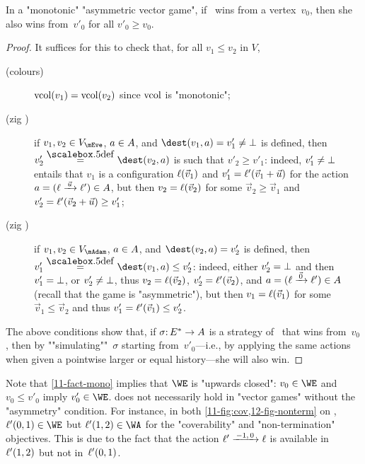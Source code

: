 \begin{lemma}[Simulation]\label{11-fact-mono}
  In a "monotonic" "asymmetric vector game", if \Eve\ wins from a
  vertex~$v_0$, then she also wins from~$v'_0$ for all $v'_0\geq
  v_0$.
\end{lemma}
\begin{proof}
  It suffices for this to check that, for all $v_1\leq v_2$ in $V$,
  \begin{description}
  \item[(colours)] $\mathrm{vcol}(v_1)=\mathrm{vcol}(v_2)$ since $\mathrm{vcol}$ is "monotonic";
  \item[(zig \Eve)] if $v_1,v_2\in V_\mEve$, $a\in A$, and
    $\dest(v_1,a)=v'_1\neq\sink$ is defined, then
    $v'_2\eqdef\dest(v_2,a)$ is such that $v'_2\geq v'_1$: indeed,
    $v'_1\neq\bot$ entails that $v_1$ is a configuration
    $\ell(\vec v_1)$ and $v'_1=\ell'(\vec v_1+\vec u)$ for the action
    $a=(\loc\step{\vec u}\loc')\in\Act$, but then $v_2=\ell(\vec v_2)$
    for some $\vec v_2\geq\vec v_1$ and
    $v'_2=\ell'(\vec v_2+\vec u)\geq v'_1$;
  \item[(zig \Adam)] if $v_1,v_2\in V_\mAdam$, $a\in A$, and
    $\dest(v_2,a)=v'_2$ is defined, then
    $v'_1\eqdef\dest(v_1,a)\leq v'_2$: indeed, either $v'_2=\bot$ and
    then $v'_1=\bot$, or $v'_2\neq\bot$, thus
    $v_2=\ell(\vec v_2)$, $v'_2=\ell'(\vec v_2)$, and
    $a=(\loc\step{\vec 0}\loc')\in\Act$ (recall that the game is
    "asymmetric"), but then $v_1=\ell(\vec v_1)$ for some
    $\vec v_1\leq\vec v_2$ and thus $v'_1=\ell'(\vec v_1)\leq v'_2$.
  \end{description}
  The above conditions show that, if $\sigma{:}\,E^\ast\to A$ is a
  strategy of \Eve\ that wins from~$v_0$, then by
  ""simulating""~$\sigma$ starting from~$v'_0$---i.e., by applying the
  same actions when given a pointwise larger or equal history---she
  will also win.
\end{proof}

Note that \cref{11-fact-mono} implies that $\WE$ is "upwards closed":
$v_0\in\WE$ and $v_0\leq v'_0$ imply $v_0'\in\WE$.  
does not necessarily hold in "vector games" without the "asymmetry"
condition.  For instance, in both \cref{11-fig:cov,12-fig-nonterm} on
, $\loc'(0,1)\in\WE$ but $\loc'(1,2)\in\WA$ for
the "coverability" and "non-termination" objectives.  This is due to
the fact that the action $\loc'\step{-1,0}\loc$ is available
in~$\ell'(1,2)$ but not in~$\ell'(0,1)$.


